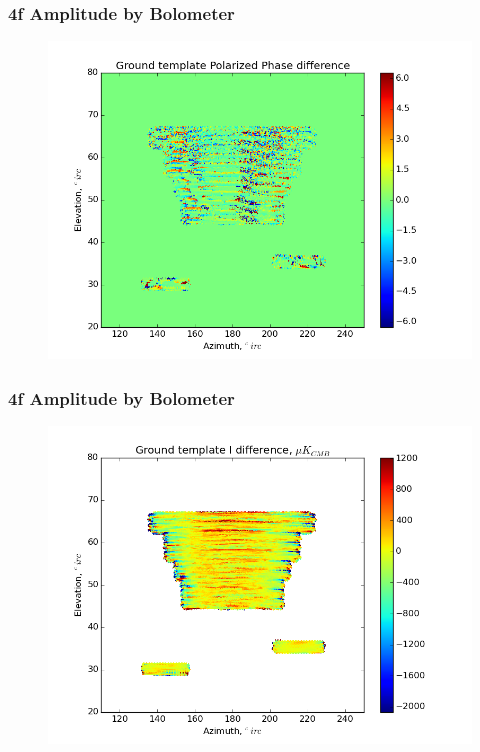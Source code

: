 \documentclass{beamer}
\begin{document}
\begin{frame}
\frametitle{4f Amplitude by Bolometer}
\begin{figure}
\includegraphics[width=0.9\linewidth]{dArg_gt_AMP_4F_BY_BOLO.png}
\end{figure}
\end{frame}

\begin{frame}
\frametitle{4f Amplitude by Bolometer}
\begin{figure}
\includegraphics[width=0.9\linewidth]{dI_gt_AMP_4F_BY_BOLO.png}
\end{figure}
\end{frame}
\end{document}
